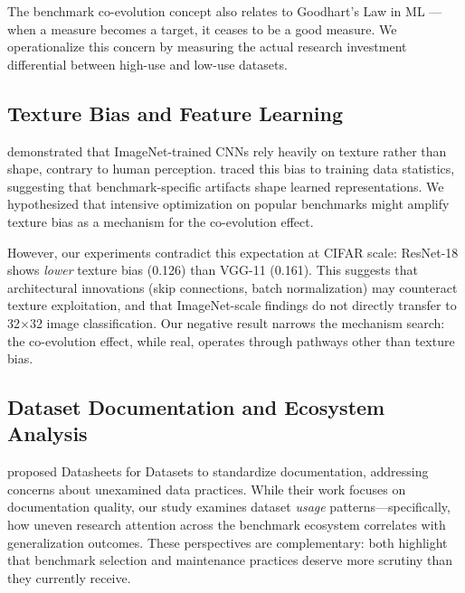 The benchmark co-evolution concept also relates to Goodhart's Law in ML \citep{thomas2022reliance}---when a measure becomes a target, it ceases to be a good measure. We operationalize this concern by measuring the actual research investment differential between high-use and low-use datasets.

\subsection{Texture Bias and Feature Learning}

\citet{geirhos2019imagenet} demonstrated that ImageNet-trained CNNs rely heavily on texture rather than shape, contrary to human perception. \citet{hermann2020origins} traced this bias to training data statistics, suggesting that benchmark-specific artifacts shape learned representations. We hypothesized that intensive optimization on popular benchmarks might amplify texture bias as a mechanism for the co-evolution effect.

However, our experiments contradict this expectation at CIFAR scale: ResNet-18 shows \emph{lower} texture bias (0.126) than VGG-11 (0.161). This suggests that architectural innovations (skip connections, batch normalization) may counteract texture exploitation, and that ImageNet-scale findings do not directly transfer to 32$\times$32 image classification. Our negative result narrows the mechanism search: the co-evolution effect, while real, operates through pathways other than texture bias.

\subsection{Dataset Documentation and Ecosystem Analysis}

\citet{gebru2021datasheets} proposed Datasheets for Datasets to standardize documentation, addressing concerns about unexamined data practices. While their work focuses on documentation quality, our study examines dataset \emph{usage} patterns---specifically, how uneven research attention across the benchmark ecosystem correlates with generalization outcomes. These perspectives are complementary: both highlight that benchmark selection and maintenance practices deserve more scrutiny than they currently receive.

